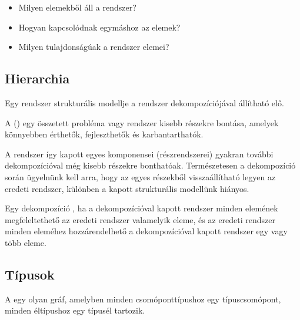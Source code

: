 \begin{itemize}
	\item Milyen elemekből áll a rendszer?
	\item Hogyan kapcsolódnak egymáshoz az elemek?
	\item Milyen tulajdonságúak a rendszer elemei?
\end{itemize}

\subsection{Hierarchia}

Egy rendszer strukturális modellje a rendszer dekompozíciójával állítható elő.

\begin{definicio}
	A  () egy összetett probléma vagy rendszer kisebb részekre bontása, amelyek könnyebben érthetők, fejleszthetők és karbantarthatók.
\end{definicio}

A rendszer így kapott egyes komponensei (részrendszerei) gyakran további dekompozícióval még kisebb részekre bonthatóak. Természetesen a dekompozíció során ügyelnünk kell arra, hogy az egyes részekből visszaállítható legyen az eredeti rendszer, különben a kapott strukturális modellünk hiányos.

\begin{definicio}
	Egy dekompozíció , ha a dekompozícióval kapott rendszer minden elemének megfeleltethető az eredeti rendszer valamelyik eleme, és az eredeti rendszer minden eleméhez hozzárendelhető a dekompozícióval kapott rendszer egy vagy több eleme.
\end{definicio}





\subsection{Típusok}

\begin{definicio}
	A  egy olyan gráf, amelyben minden csomóponttípushoz egy típuscsomópont, minden éltípushoz egy típusél tartozik.
\end{definicio}

